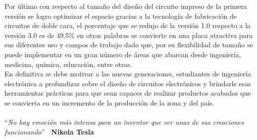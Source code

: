 \documentclass[times, 10pt,twocolumn]{article}
\begin{document}
Por último con respecto al tamaño del diseño del circuito impreso de la primera versión se logro optimizar el espacio gracias a la tecnología de fabricación de circuitos de doble cara, el porcentaje que se redujo de la versión 1.0 respecto a la versión 3.0 es de 49.5\% en otras palabras se convierte en una placa atractiva para sus diferentes uso y campos de trabajo dado que, por su flexibilidad de tamaño se puede implementar en un gran número de áreas que abarcan desde ingeniería, medicina, química, educación, entre otras.\\

En definitiva se debe motivar a las nuevas generaciones, estudiantes de ingeniería electrónica a profundizar sobre el diseño de circuitos electrónicos y brindarle esas herramientas prácticas para que sean capaces de realizar productos acabados que se convierta en un incremento de la producción de la zona y del país. \\ \\

``\textit{No hay emoción más intensa para un inventor que ver unas de sus creaciones
funcionando}''\hspace*{1.5cm} \textbf{\scriptsize ~Nikola Tesla}


\end{document}
